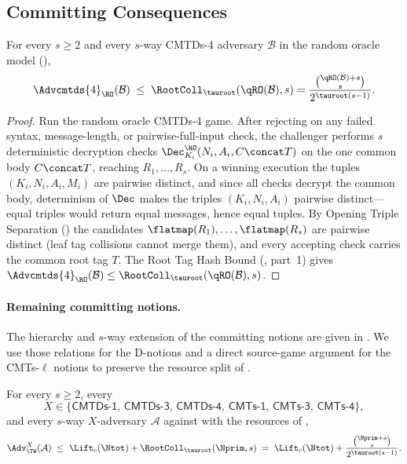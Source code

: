 \subsection{Committing Consequences}

\begin{theorem}
\label{thm:cmtds4-ro}
For every $s \geq 2$ and every $s$-way CMTDs-4
adversary $\mathcal{B}$ in the \TW{} random oracle model
(),
\[
  \Advcmtds{4}_\RO(\mathcal{B})
  \;\leq\; \RootColl_{\tauroot}(\qRO(\mathcal{B}), s)
  = \frac{\binom{\qRO(\mathcal{B}) + s}{s}}{2^{\tauroot (s - 1)}}.
\]
\end{theorem}

\begin{proof}
Run the random oracle CMTDs-4 game. After rejecting on any failed syntax,
message-length, or pairwise-full-input check, the challenger performs $s$
deterministic decryption checks $\Dec_{K_i}^\RO(N_i,A_i,C \concat T)$ on
the one common body $C \concat T$, reaching $R_1,\dots,R_s$. On a winning
execution the tuples $(K_i,N_i,A_i,M_i)$ are pairwise distinct, and since
all checks decrypt the common body, determinism of $\Dec$ makes the
triples $(K_i,N_i,A_i)$ pairwise distinct---equal triples would return
equal messages, hence equal tuples. By Opening Triple Separation
() the candidates $\flatmap(R_1),\dots,\flatmap(R_s)$
are pairwise distinct (leaf tag collisions cannot merge them), and every
accepting check carries the common root tag $T$. The Root Tag Hash Bound
(, part~1) gives
$\Advcmtds{4}_\RO(\mathcal{B}) \leq \RootColl_{\tauroot}(\qRO(\mathcal{B}), s)$.
\end{proof}

\paragraph{Remaining committing notions.}
The hierarchy and $s$-way extension of the \cite{BH22} committing notions
are given in \cite[\S3, Figs.~4--5, and App.~A]{BH22}. We use those
relations for the D-notions and a direct source-game argument for the
CMTs-$\ell$ notions to preserve the resource split of
.

\begin{corollary}
\label{cor:committing-combined}
For every $s \geq 2$, every
\[
  X \in \bigl\{\mathsf{CMTDs\text{-}1},\, \mathsf{CMTDs\text{-}3},\,
              \mathsf{CMTDs\text{-}4},\, \mathsf{CMTs\text{-}1},\,
              \mathsf{CMTs\text{-}3},\, \mathsf{CMTs\text{-}4}\bigr\},
\]
and every $s$-way $X$-adversary $\mathcal{A}$ against \TW{} with the
resources of ,
\[
  \Adv^X_\TW(\mathcal{A})
  \;\leq\;
  \Lift_c(\Ntot) + \RootColl_{\tauroot}(\Nprim, s)
  \;=\;
  \Lift_c(\Ntot) + \frac{\binom{\Nprim + s}{s}}{2^{\tauroot(s-1)}}.
\]
\end{corollary}

